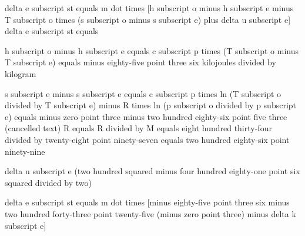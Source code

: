 delta e subscript st equals m dot times [h subscript o minus h subscript e minus T subscript o times (s subscript o minus s subscript e) plus delta u subscript e]  
delta e subscript st equals  

h subscript o minus h subscript e equals c subscript p times (T subscript o minus T subscript e) equals minus eighty-five point three six kilojoules divided by kilogram  

s subscript e minus s subscript e equals c subscript p times ln (T subscript o divided by T subscript e) minus R times ln (p subscript o divided by p subscript e) equals minus zero point three minus two hundred eighty-six point five three (cancelled text)  
R equals R divided by M equals eight hundred thirty-four divided by twenty-eight point ninety-seven equals two hundred eighty-six point ninety-nine  

delta u subscript e (two hundred squared minus four hundred eighty-one point six squared divided by two)  

delta e subscript st equals m dot times [minus eighty-five point three six minus two hundred forty-three point twenty-five (minus zero point three) minus delta k subscript e]